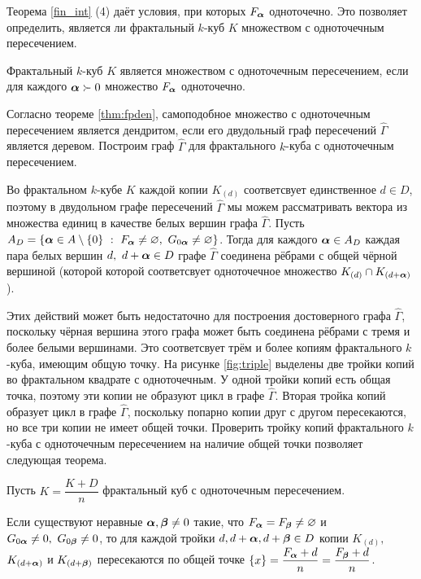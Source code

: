 Теорема \ref{fin_int} (4) даёт условия, при которых $F_{\bm{\alpha}}$ одноточечно.
Это позволяет определить, является ли фрактальный $k$-куб $K$ множеством с одноточечным пересечением. 

\begin{corollary}\label{SIPQ}
Фрактальный $k$-куб $K$ является множеством с одноточечным пересечением, если для каждого ${\bm{\alpha}}\succ0$ множество $F_{\bm{\alpha}}$ одноточечно.
\end{corollary}


Согласно теореме \ref{thm:fpden}, самоподобное множество с одноточечным пересечением является дендритом, если его двудольный граф пересечений $\hat\Gamma$ является деревом.
Построим граф $\hat\Gamma$ для фрактального $k$-куба с одноточечным пересечением.

Во фрактальном $k$-кубе $K$ каждой копии $K_{(d)}$ соответсвует единственное $d\in D$, поэтому в двудольном графе пересечений $\hat\Gamma$ мы можем рассматривать вектора из множества единиц в качестве белых вершин графа $\hat\Gamma$.
Пусть $A_D=\{\bma\in A\mmm\{0\}\ :\ F_\bma\neq\0,\ G_{0\bma}\neq\0\}$.
Тогда для каждого ${\bm{\alpha}}\in A_D$ каждая пара белых вершин $d,\ d+{\bm{\alpha}}\in D$ графе $\hat\Gamma$ соединена рёбрами с общей чёрной вершиной (которой которой соответсвует одноточечное множество $K_{(d)}\cap K_{(d+{\bm{\alpha}})}$).

Этих действий может быть недостаточно для построения достоверного графа $\hat\Gamma$, поскольку чёрная вершина этого графа может быть соединена рёбрами с тремя и более белыми вершинами.
Это соответсвует трём и более копиям фрактального $k$-куба, имеющим общую точку.
На рисунке \ref{fig:triple} выделены две тройки копий во фрактальном квадрате с одноточечным.
У одной тройки копий есть общая точка, поэтому эти копии не образуют цикл в графе $\hat\Gamma$.
Вторая тройка копий образует цикл в графе $\hat\Gamma$, поскольку попарно копии друг с другом пересекаются, но все три копии не имеет общей точки.
Проверить тройку копий фрактального $k$-куба с одноточечным пересечением на наличие общей точки позволяет следующая теорема.


\begin{theorem}\label{thm:triple}
Пусть $K=\dfrac{K+D}{n}$ фрактальный куб с одноточечным пересечением. 

Если существуют неравные ${\bm{\alpha}},{\bm{\beta}}\neq0$ такие, что $F_{\bm{\alpha}}=F_{\bm{\beta}}\neq\varnothing$ и $G_{0{\bm{\alpha}}}\neq0,\ G_{0{\bm{\beta}}}\neq0$,  то для каждой тройки $d, d+{\bm{\alpha}}, d+{\bm{\beta}}\in D$ копии $K_{(d)},$ $K_{(d+{\bm{\alpha}})}$ и $K_{(d+{\bm{\beta}})}$ пересекаются по общей точке $\{x\}=\dfrac{F_{\bm{\alpha}}+d}{n}=\dfrac{F_{\bm{\beta}}+d}{n}$.
\end{theorem}

